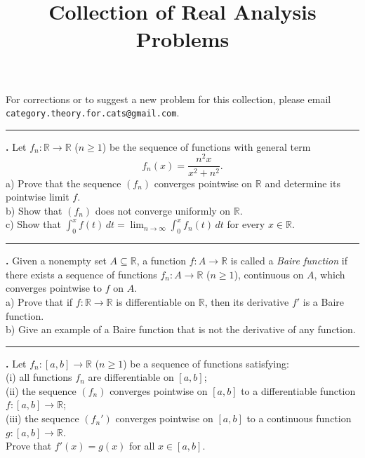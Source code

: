 \documentclass[11pt]{article}
\title{Collection of Real Analysis Problems}
\date{}
\newcounter{probnum}
\newenvironment{problembox}{\par\noindent\rule{\linewidth}{0.5pt}\vspace{5pt}\par}{\vspace{2pt}}
\begin{document}
\maketitle

\begin{notebox}
For corrections or to suggest a new problem for this collection, please email \texttt{category.theory.for.cats@gmail.com}.
\end{notebox}

\begin{problembox}
\textbf{\theprobnum.} Let $f_n : \mathbb{R} \to \mathbb{R}$ ($n \ge 1$) be the sequence of functions with general term
\[
f_n(x) = \frac{n^2 x}{x^2 + n^2}.
\]
a) Prove that the sequence $(f_n)$ converges pointwise on $\mathbb{R}$ and determine its pointwise limit $f$.\\
b) Show that $(f_n)$ does not converge uniformly on $\mathbb{R}$.\\
c) Show that $\displaystyle\int_0^x f(t)\,dt = \lim_{n \to \infty} \int_0^x f_n(t)\,dt$ for every $x \in \mathbb{R}$.
\end{problembox}

\begin{problembox}
\textbf{\theprobnum.} Given a nonempty set $A \subseteq \mathbb{R}$, a function $f : A \to \mathbb{R}$ is called a \emph{Baire function} if there exists a sequence of functions $f_n : A \to \mathbb{R}$ ($n \ge 1$), continuous on $A$, which converges pointwise to $f$ on $A$.\\
a) Prove that if $f : \mathbb{R} \to \mathbb{R}$ is differentiable on $\mathbb{R}$, then its derivative $f'$ is a Baire function.\\
b) Give an example of a Baire function that is not the derivative of any function.
\end{problembox}

\begin{problembox}
\textbf{\theprobnum.} Let $f_n : [a,b] \to \mathbb{R}$ ($n \ge 1$) be a sequence of functions satisfying:\\
(i) all functions $f_n$ are differentiable on $[a,b]$;\\
(ii) the sequence $(f_n)$ converges pointwise on $[a,b]$ to a differentiable function $f : [a,b] \to \mathbb{R}$;\\
(iii) the sequence $(f_n')$ converges pointwise on $[a,b]$ to a continuous function $g : [a,b] \to \mathbb{R}$.\\
Prove that $f'(x) = g(x)$ for all $x \in [a,b]$.
\end{problembox}
\end{document}
